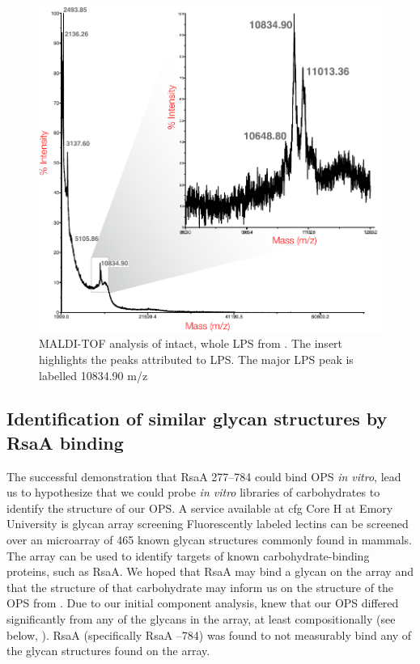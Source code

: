 \begin{figure}[htb]
  \begin{center}
    \includegraphics[]{lps_chapter/img/malditof.pdf}
  \end{center}
  \caption[\Ac{MALDI-TOF} analysis of intact, whole \ac{LPS} from \caulobacter]{\ac{MALDI-TOF}
    analysis of intact, whole \ac{LPS} from \caulobacter. The insert highlights the peaks
    attributed to \ac{LPS}. The major \ac{LPS} peak is labelled 10834.90 m/z}
  \label{fig:lpsmalditof}
\end{figure}

\subsection{Identification of similar glycan structures by RsaA binding} \label{sec:ident-simil-glyc}
  
The successful demonstration that RsaA \del{}277--784 could bind \caulobacter{} \ac{OPS} \textit{in vitro}, lead us to hypothesize that we could probe \textit{in vitro} libraries of carbohydrates to identify the structure of our \ac{OPS}. A service available at \ac{cfg} Core H at Emory University is glycan array screening Fluorescently labeled lectins can be screened over an microarray of 465 known glycan structures commonly found in mammals. The array can be used to identify targets of known carbohydrate-binding proteins, such as RsaA. We hoped that RsaA may bind a glycan on the array and that the structure of that carbohydrate may inform us on the structure of the \ac{OPS} from \caulobacter. Due to our initial component analysis, knew that our \ac{OPS} differed significantly from any of the glycans in the array, at least compositionally (see below, ). RsaA (specifically RsaA --784) was found to not measurably bind any of the glycan structures found on the array. 

